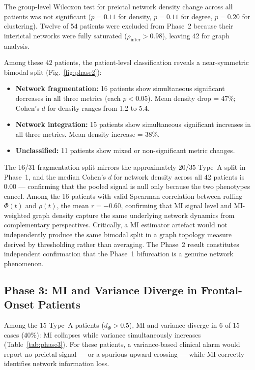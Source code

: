 \documentclass[final,5p,times,twocolumn]{elsarticle}
\begin{document}
The group-level Wilcoxon test for preictal network density change across
all patients was not significant ($p = 0.11$ for density, $p = 0.11$
for degree, $p = 0.20$ for clustering).
%
Twelve of 54 patients were excluded from Phase~2 because their
interictal networks were fully saturated ($\rho_{\text{inter}} > 0.98$),
leaving 42 for graph analysis.

Among these 42 patients, the patient-level classification reveals a
near-symmetric bimodal split (Fig.~\ref{fig:phase2}):

\begin{itemize}
  \item \textbf{Network fragmentation:} 16 patients show simultaneous
        significant decreases in all three metrics (each $p < 0.05$).
        Mean density drop = 47\%; Cohen's $d$ for density ranges from
        1.2 to 5.4.

  \item \textbf{Network integration:} 15 patients show simultaneous
        significant increases in all three metrics.
        Mean density increase = 38\%.

  \item \textbf{Unclassified:} 11 patients show mixed or non-significant
        metric changes.
\end{itemize}

The 16/31 fragmentation split mirrors the approximately 20/35 Type~A
split in Phase~1, and the median Cohen's $d$ for network density across
all 42 patients is 0.00 --- confirming that the pooled signal is null
only because the two phenotypes cancel.
%
Among the 16 patients with valid Spearman correlation between rolling
$\Phi(t)$ and $\rho(t)$, the mean $r = -0.60$, confirming that MI
signal level and MI-weighted graph density capture the same underlying
network dynamics from complementary perspectives.
%
Critically, a MI estimator artefact would not independently produce the
same bimodal split in a graph topology measure derived by thresholding
rather than averaging.
%
The Phase~2 result constitutes independent confirmation that the Phase~1
bifurcation is a genuine network phenomenon.

\subsection{Phase 3: MI and Variance Diverge in Frontal-Onset Patients}

Among the 15 Type~A patients ($d_\Phi > 0.5$), MI and variance
diverge in 6 of 15 cases (40\%): MI collapses while variance
simultaneously increases (Table~\ref{tab:phase3}).
%
For these patients, a variance-based clinical alarm would report no
preictal signal --- or a spurious upward crossing --- while MI
correctly identifies network information loss.
\end{document}

